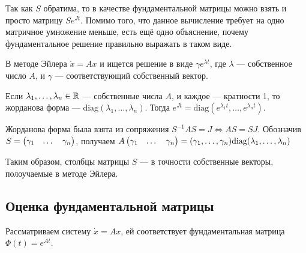\documentclass[a4paper]{report}
\begin{document}
    Так как $S$ обратима, то в качестве фундаментальной матрицы можно взять и просто матрицу $Se^{Jt}$.
    Помимо того, что данное вычисление требует на одно матричное умножение меньше, есть ещё одно объяснение, почему фундаментальное решение правильно выражать в таком виде.

    В методе Эйлера $\dot{x} = Ax$ и ищется решение в виде $\gamma e^{\lambda t}$, где $\lambda$ --- собственное число $A$, и $\gamma$ --- соответствующий собственный вектор.

    Если $\lambda_1, \dots, \lambda_n \in \mathbb{R}$  --- собственные числа $A$, и каждое --- кратности 1, то жорданова форма --- $\text{diag}(\lambda_1, \dots, \lambda_n)$.
    Тогда $e^{Jt} = \text{diag}\left(e^{\lambda_1 t}, \dots, e^{\lambda_n t}\right)$.

    Жорданова форма была взята из сопряжения $S^{-1} A S = J \iff A S = SJ$.
    Обозначив $S = \begin{pmatrix}\gamma_1 & \dots & \gamma_n\end{pmatrix}$, получаем $A\begin{pmatrix}\gamma_1 & \dots & \gamma_n\end{pmatrix} = (\gamma_1, \dots, \gamma_n)\text{diag}(\lambda_1, \dots, \lambda_n)$

    Таким образом, столбцы матрицы $S$ --- в точности собственные векторы, полоучаемые в методе Эйлера.
    \subsection{Оценка фундаментальной матрицы}
    Рассматриваем систему $\dot{x} = Ax$, ей соответствует фундаментальная матрица $\Phi(t) = e^{At}$.

\end{document}
